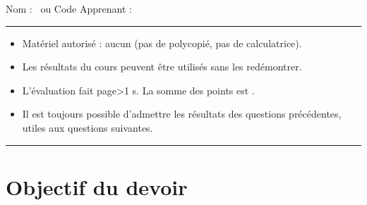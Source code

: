 

\SetDate[24/11/2026]
\reversemarginpar
\setlength{\marginparsep}{.5cm}



\null\vspace{-20pt}
Nom : \hrulefill ~ou Code Apprenant :  \rule{3cm}{.1pt}

\begin{itemize}[label=$\bullet$]
	\item
	Matériel autorisé : aucun (pas de polycopié, pas de calculatrice).
	\item
	Les résultats du cours peuvent être utilisés sans les redémontrer.
	\item
	L'évaluation fait \pageref{lastpage} page\ifnum{}>1 s\fi. La somme des points est .
	\item
	Il est toujours possible d'admettre les résultats des questions précédentes, utiles aux questions suivantes.
\end{itemize}

\hrule 

\marginpar{[pts]}



%	
%
%
%	
%	


\section*{Objectif du devoir}

